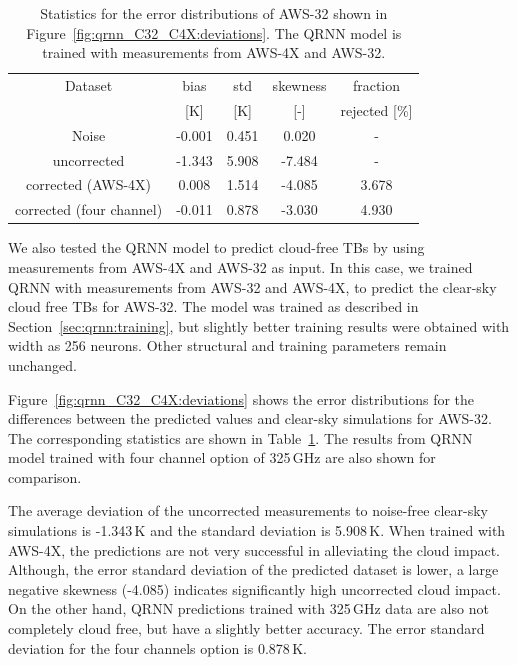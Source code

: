 \documentclass[12pt]{article}
\begin{document}
\begin{table}[!tb]
	\centering
	\begin{tabular}[b]{c|c|c|c|c}
		Dataset  		  &   bias &   std &   skewness & fraction  \\
		&   [K]  &   [K] & [-] & rejected [\%]\\
		\hline
		Noise                      & -0.001 & 0.451 &              0.020 &      - \\
		uncorrected                & -1.343 & 5.908 &             -7.484 &      - \\
		corrected (AWS-4X)         &  0.008 & 1.514 &             -4.085 &      3.678 \\
		corrected (four channel)   & -0.011 & 0.878 &             -3.030 &      4.930 \\
		\hline
	\end{tabular}
	\caption{Statistics for the error distributions of AWS-32 shown in Figure~\ref{fig:qrnn_C32_C4X:deviations}. The QRNN model is trained with measurements from AWS-4X and AWS-32.}
	\label{tab:qrnn:C32:C4X}
\end{table} 
We also tested the QRNN model to predict cloud-free TBs by using measurements
from AWS-4X and AWS-32 as input. In this case, we trained QRNN with
measurements from AWS-32 and AWS-4X, to predict the clear-sky cloud free TBs
for AWS-32. The model was trained as described in
Section~\ref{sec:qrnn:training}, but slightly better training results were
obtained with width as 256 neurons. Other structural and training parameters
remain unchanged.

Figure~\ref{fig:qrnn_C32_C4X:deviations} shows the error distributions for the
differences between the predicted values and clear-sky simulations for AWS-32.
The corresponding statistics are shown in Table~\ref{tab:qrnn:C32:C4X}. The
results from QRNN model trained with four channel option of 325\,GHz are also
shown for comparison.

The average deviation of the uncorrected measurements to noise-free clear-sky
simulations is -1.343\,K and the standard deviation is 5.908\,K. When trained
with AWS-4X, the predictions are not very successful in alleviating the cloud
impact. Although, the error standard deviation of the predicted dataset is
lower, a large negative skewness (-4.085) indicates significantly high
uncorrected cloud impact. On the other hand, QRNN predictions trained with
325\,GHz data are also not completely cloud free, but have a slightly better
accuracy. The error standard deviation for the four channels option is
0.878\,K.
\end{document}
